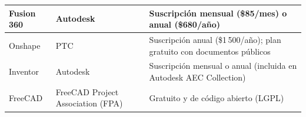 \begin{ThreePartTable}
\begin{longtable}{@{}P{0.22\textwidth}P{0.28\textwidth}P{0.44\textwidth}@{}}
        \midrule

        Fusion 360 &
            Autodesk &
                Suscripción mensual (\$85/mes) o anual (\$680/año) \\

        \midrule

        Onshape &
            PTC &
                Suscripción anual (\$1\,500/año); plan gratuito con documentos públicos \\

        \midrule

        Inventor &
            Autodesk &
                Suscripción mensual o anual (incluida en Autodesk AEC Collection) \\

        \midrule

        FreeCAD &
            FreeCAD Project Association (FPA) &
                Gratuito y de código abierto (LGPL) \\

    \end{longtable}

\end{ThreePartTable}